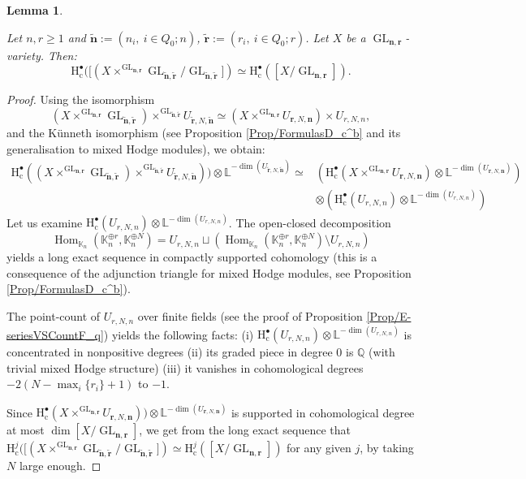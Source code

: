 \documentclass[11pt,english]{article}
\numberwithin{equation}{section}
\numberwithin{figure}{section}
\theoremstyle{definition}
\theoremstyle{plain}
\newtheorem{lem}[df]{Lemma}
\theoremstyle{remark}
\DeclareMathOperator{\Hom}{Hom}
\DeclareMathOperator{\GL}{GL}
\newcommand\nn{\mathbf{n}}
\newcommand\rr{\mathbf{r}}
\newcommand\HH{\mathrm{H}}
\newcommand\QQ{\mathbb{Q}}
\newcommand\KK{\mathbb{K}}
\begin{document}
\begin{lem} \label{Lem/GrpChg}

Let $n,r\geq1$ and $\tilde{\nn}:=(n_{i},\ i\in Q_{0};n)$, $\tilde{\rr}:=(r_{i},\ i\in Q_{0};r)$.
Let $X$ be a $\GL_{\nn,\rr}$-variety. Then:\[
\HH_{\mathrm{c}}^{\bullet}([(X\times^{\GL_{\nn,\rr}}\GL_{\tilde{\nn},\tilde{\rr}}/\GL_{\tilde{\nn},\tilde{\rr}}])
\simeq
\HH_{\mathrm{c}}^{\bullet}([X/\GL_{\nn,\rr}]).
\]

\end{lem}

\begin{proof}

Using the isomorphism\[
\left(
X\times^{\GL_{\nn,\rr}}\GL_{\tilde{\nn},\tilde{\rr}}
\right)
\times^{\GL_{\tilde{\nn},\tilde{\rr}}}U_{\tilde{\rr},N,\tilde{\nn}}
\simeq
\left(
X\times^{\GL_{\nn,\rr}}U_{\rr,N,\nn}
\right)
\times U_{r,N,n},
\] and the Künneth isomorphism (see Proposition \ref{Prop/FormulasD_c^b}
and its generalisation to mixed Hodge modules), we obtain:\[
\begin{split}
\HH_{\mathrm{c}}^{\bullet}((X\times^{\GL_{\nn,\rr}}\GL_{\tilde{\nn},\tilde{\rr}})\times^{\GL_{\tilde{\nn},\tilde{\rr}}}U_{\tilde{\rr},N,\tilde{\nn}}))
\otimes \mathbb{L}^{-\dim(U_{\tilde{\rr},N,\tilde{\nn}})}
\simeq & \left(\HH_{\mathrm{c}}^{\bullet}(X\times^{\GL_{\nn,\rr}}U_{\rr,N,\nn})
\otimes \mathbb{L}^{-\dim(U_{\rr,N,\nn})}
\right) \\
& \otimes
\left(
\HH_{\mathrm{c}}^{\bullet}(U_{r,N,n})\otimes\mathbb{L}^{-\dim(U_{r,N,n})}
\right)
\end{split}
\] Let us examine $\HH_{\mathrm{c}}^{\bullet}(U_{r,N,n})\otimes\mathbb{L}^{-\dim(U_{r,N,n})}$.
The open-closed decomposition\[
\Hom_{\KK_{n}}(\KK_{n}^{\oplus r},\KK_{n}^{\oplus N})=U_{r,N,n}\sqcup\left(\Hom_{\KK_{n}}(\KK_{n}^{\oplus r},\KK_{n}^{\oplus N})\setminus U_{r,N,n}\right)
\] yields a long exact sequence in compactly supported cohomology (this
is a consequence of the adjunction triangle for mixed Hodge modules,
see Proposition \ref{Prop/FormulasD_c^b}).

The point-count of $U_{r,N,n}$ over finite fields (see the proof
of Proposition \ref{Prop/E-seriesVSCountF_q}) yields the following
facts: (i) $\HH_{\mathrm{c}}^{\bullet}(U_{r,N,n})\otimes\mathbb{L}^{-\dim(U_{r,N,n})}$
is concentrated in nonpositive degrees (ii) its graded piece in degree
0 is $\QQ$ (with trivial mixed Hodge structure) (iii) it vanishes
in cohomological degrees $-2(N-\max_{i}\{r_{i}\}+1)$ to $-1$.

Since $\HH_{\mathrm{c}}^{\bullet}(X\times^{\GL_{\nn,\rr}}U_{\rr,N,\nn}))\otimes\mathbb{L}^{-\dim(U_{\rr,N,\nn})}$
is supported in cohomological degree at most $\dim\left[X/\GL_{\nn,\rr}\right]$,
we get from the long exact sequence that $\HH_{\mathrm{c}}^{j}([(X\times^{\GL_{\nn,\rr}}\GL_{\tilde{\nn},\tilde{\rr}}/\GL_{\tilde{\nn},\tilde{\rr}}])\simeq\HH_{\mathrm{c}}^{j}([X/\GL_{\nn,\rr}])$
for any given $j$, by taking $N$ large enough. \end{proof}
\end{document}
